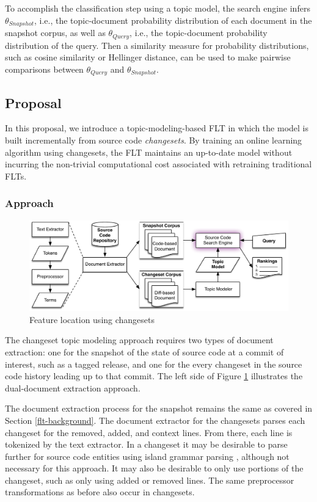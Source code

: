 \documentclass[12pt,draft]{Manuscript}
\begin{document}
\begin{body}
To accomplish the classification step using a topic model, the search
engine infers \(\theta_{Snapshot}\), i.e., the topic-document
probability distribution of each document in the snapshot corpus, as
well as \(\theta_{Query}\), i.e., the topic-document probability
distribution of the query. Then a similarity measure for probability
distributions, such as cosine similarity or Hellinger distance, can be
used to make pairwise comparisons between \(\theta_{Query}\) and
\(\theta_{Snapshot}\).

\subsection{Proposal}\label{proposal}

In this proposal, we introduce a topic-modeling-based FLT in which the
model is built incrementally from source code \emph{changesets}. By
training an online learning algorithm using changesets, the FLT
maintains an up-to-date model without incurring the non-trivial
computational cost associated with retraining traditional FLTs.

\subsubsection{Approach}\label{flt-proposed-approach}

\begin{figure}[htbp]
\centering
\includegraphics{figures/changeset-flt.pdf}
\caption{Feature location using changesets\label{fig:changeset-flt}}
\end{figure}

The changeset topic modeling approach requires two types of document
extraction: one for the snapshot of the state of source code at a commit
of interest, such as a tagged release, and one for the every changeset
in the source code history leading up to that commit. The left side of
Figure \ref{fig:changeset-flt} illustrates the dual-document extraction
approach.

The document extraction process for the snapshot remains the same as
covered in Section \ref{flt-background}. The document extractor for the
changesets parses each changeset for the removed, added, and context
lines. From there, each line is tokenized by the text extractor. In a
changeset it may be desirable to parse further for source code entities
using island grammar parsing \citep{Moonen:2001}, although not necessary
for this approach. It may also be desirable to only use portions of the
changeset, such as only using added or removed lines. The same
preprocessor transformations as before also occur in changesets.


\end{body}
\end{document}
